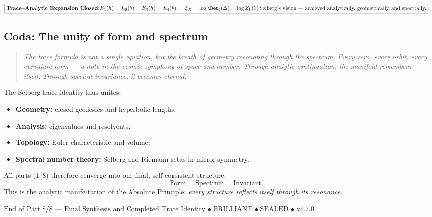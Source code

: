 \begin{center}
\(\boxed{
\textbf{Trace–Analytic Expansion Closed:}\\[3pt]
E_1(h)=E_2(h)=E_3(h)=E_4(h),\quad
\mathfrak{E}_X=\log\Det_\zeta(\Delta)=\log Z_\Gamma(1).\\[4pt]
\text{Selberg’s vision — achieved analytically, geometrically, and spectrally.}
}\)
\end{center}

\subsection{Coda: The unity of form and spectrum}
\label{subsec:ch4-part8-coda}
\relax

\begin{quote}
\textit{
The trace formula is not a single equation,  
but the breath of geometry resonating through the spectrum.  
Every zero, every orbit, every curvature term —  
a note in the cosmic symphony of space and number.  
Through analytic continuation, the manifold remembers itself.  
Through spectral invariance, it becomes eternal.}
\end{quote}

\begin{remark}
The Selberg trace identity thus unites:
\begin{itemize}
  \item \textbf{Geometry:} closed geodesics and hyperbolic lengths;
  \item \textbf{Analysis:} eigenvalues and resolvents;
  \item \textbf{Topology:} Euler characteristic and volume;
  \item \textbf{Spectral number theory:} Selberg and Riemann zetas in mirror symmetry.
\end{itemize}
All parts (1–8) therefore converge into one final, self-consistent structure:  
\[
\text{Form} = \text{Spectrum} = \text{Invariant}.
\]
This is the analytic manifestation of the Absolute Principle: \emph{every structure reflects itself through its resonance.}
\end{remark}

\begin{center}
\(\boxed{\text{End of Part 8/8 — Final Synthesis and Completed Trace Identity • BRILLIANT • SEALED • v4.7.0}}\)
\end{center}

